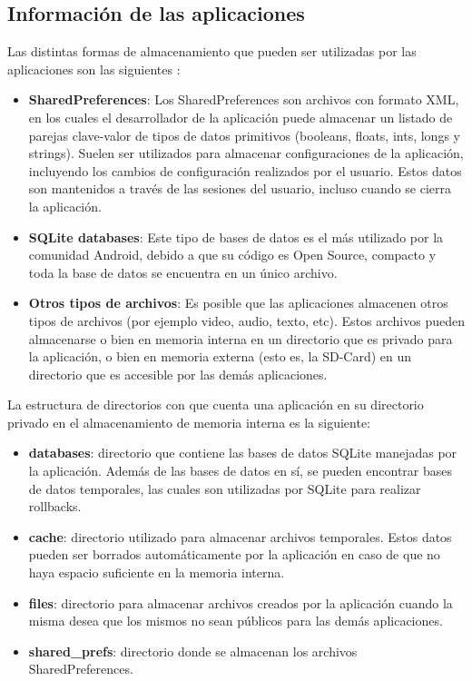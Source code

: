 \subsection{Información de las aplicaciones}
Las distintas formas de almacenamiento que pueden ser utilizadas por las aplicaciones son las siguientes \cite{androidStrg}:

\begin{itemize}
\item \textbf{SharedPreferences}: Los SharedPreferences son archivos con formato XML, en los cuales el desarrollador de la aplicación puede almacenar un listado de parejas clave-valor de tipos de datos primitivos (booleans, floats, ints, longs y strings). Suelen ser utilizados para almacenar configuraciones de la aplicación, incluyendo los cambios de configuración realizados por el usuario. Estos datos son mantenidos a través de las sesiones del usuario, incluso cuando se cierra la aplicación. 
\item \textbf{SQLite databases}: Este tipo de bases de datos es el más utilizado por la comunidad Android, debido a que su código es Open Source, compacto y toda la base de datos se encuentra en un único archivo. 
\item \textbf{Otros tipos de archivos}: Es posible que las aplicaciones almacenen otros tipos de archivos (por ejemplo video, audio, texto, etc). Estos archivos pueden almacenarse o bien en memoria interna en un directorio que es privado para la aplicación, o bien en memoria externa (esto es, la SD-Card) en un directorio que es accesible por las demás aplicaciones.
\end{itemize}

La estructura de directorios con que cuenta una aplicación en su directorio privado en el almacenamiento de memoria interna es la siguiente:

\begin{itemize}
\item \textbf{databases}: directorio que contiene las bases de datos SQLite manejadas por la aplicación. Además de las bases de datos en sí, se pueden encontrar bases de datos temporales, las cuales son utilizadas por SQLite para realizar rollbacks.
\item \textbf{cache}: directorio utilizado para almacenar archivos temporales. Estos datos pueden ser borrados automáticamente por la aplicación en caso de que no haya espacio suficiente en la memoria interna.
\item \textbf{files}: directorio para almacenar archivos creados por la aplicación cuando la misma desea que los mismos no sean públicos para las demás aplicaciones.
\item \textbf{shared\_prefs}: directorio donde se almacenan los archivos SharedPreferences.
\end{itemize}

